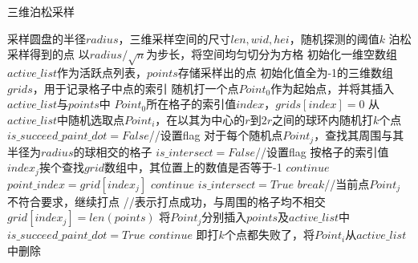 \documentclass[11pt]{ctexart}
\begin{document}
  
    \begin{algorithm}  
        \caption{三维泊松采样}  
        \begin{algorithmic}[1] %
            \Require 采样圆盘的半径$radius$，三维采样空间的尺寸$len,wid,hei$，随机探测的阈值$k$
            \Ensure 泊松采样得到的点
                \State 以$radius/\sqrt{n}$为步长，将空间均匀切分为方格
                \State 初始化一维空数组$active\_list$作为活跃点列表，$points$存储采样出的点
                \State 初始化值全为-1的三维数组$grids$，用于记录格子中点的索引
                \State 随机打一个点$Point_0$作为起始点，并将其插入$active\_list$与$points$中
                \State $Point_0$所在格子的索引值$index$，$grids[index]=0$
                    \State 从$active\_list$中随机选取点$Point_i$，在以其为中心的$r$到$2r$之间的球环内随机打$k$个点
                    \State $is\_succeed\_paint\_dot = False$//设置flag
                    \State 对于每个随机点$Point_j$，查找其周围与其半径为$radius$的球相交的格子
                    \State $is\_intersect = False$//设置flag
                   	 \State 按格子的索引值$index_j$挨个查找$grid$数组中，其位置上的数值是否等于-1
	 			 $continue$
				\Else
				\State $point\_index = grid[index_j]$
				 $continue$
				\Else
				\State $is\_intersect = True$
				\State $break$//当前点$Point_j$不符合要求，继续打点
				\EndIf
				\EndIf
                    \EndFor
                    //表示打点成功，与周围的格子均不相交
                    \State $grid[index_j] = len(points)$
                    \State 将$Point_j$分别插入$points$及$active\_list$中
                    \State $is\_succeed\_paint\_dot = True$
                    \Else $continue$
                    \EndIf
                    \EndFor
                    \State 即打$k$个点都失败了，将$Point_i$从$active\_list$中删除
                    \EndIf
                \EndWhile  
                \State {}  
            \EndFunction  
            \State  

        \end{algorithmic}  
    \end{algorithm}  
\end{document}
